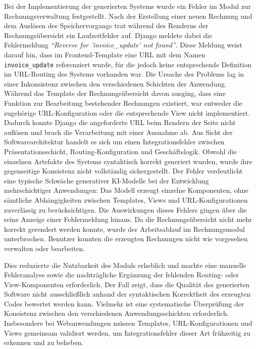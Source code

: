 Bei der Implementierung der generierten Systems wurde ein Fehler im Modul zur Rechnungsverwaltung festgestellt. Nach der Erstellung einer neuen Rechnung und dem Auslösen des Speichervorgangs trat während des Renderns der Rechnungsübersicht ein Laufzeitfehler auf. Django meldete dabei die Fehlermeldung \textit{``Reverse for 'invoice\_update' not found''}. Diese Meldung weist darauf hin, dass im Frontend-Template eine URL mit dem Namen \texttt{invoice\_update} referenziert wurde, für die jedoch keine entsprechende Definition im URL-Routing des Systems vorhanden war.
Die Ursache des Problems lag in einer Inkonsistenz zwischen den verschiedenen Schichten der Anwendung. Während das Template der Rechnungsübersicht davon ausging, dass eine Funktion zur Bearbeitung bestehender Rechnungen existiert, war entweder die zugehörige URL-Konfiguration oder die entsprechende View nicht implementiert. Dadurch konnte Django die angeforderte URL beim Rendern der Seite nicht auflösen und brach die Verarbeitung mit einer Ausnahme ab.
Aus Sicht der Softwarearchitektur handelt es sich um einen Integrationsfehler zwischen Präsentationsschicht, Routing-Konfiguration und Geschäftslogik. Obwohl die einzelnen Artefakte des Systems syntaktisch korrekt generiert wurden, wurde ihre gegenseitige Konsistenz nicht vollständig sichergestellt. Der Fehler verdeutlicht eine typische Schwäche generativer KI-Modelle bei der Entwicklung mehrschichtiger Anwendungen: Das Modell erzeugt einzelne Komponenten, ohne sämtliche Abhängigkeiten zwischen Templates, Views und URL-Konfigurationen zuverlässig zu berücksichtigen.
Die Auswirkungen dieses Fehlers gingen über die reine Anzeige einer Fehlermeldung hinaus. Da die Rechnungsübersicht nicht mehr korrekt gerendert werden konnte, wurde der Arbeitsablauf im Rechnungsmodul unterbrochen. Benutzer konnten die erzeugten Rechnungen nicht wie vorgesehen verwalten oder bearbeiten.

Dies reduzierte die Nutzbarkeit des Moduls erheblich und machte eine manuelle Fehleranalyse sowie die nachträgliche Ergänzung der fehlenden Routing- oder View-Komponenten erforderlich.
Der Fall zeigt, dass die Qualität des generierten Software nicht ausschließlich anhand der syntaktischen Korrektheit des erzeugten Codes bewertet werden kann. Vielmehr ist eine systematische Überprüfung der Konsistenz zwischen den verschiedenen Anwendungsschichten erforderlich. Insbesondere bei Webanwendungen müssen Templates, URL-Konfigurationen und Views gemeinsam validiert werden, um Integrationsfehler dieser Art frühzeitig zu erkennen und zu beheben.
